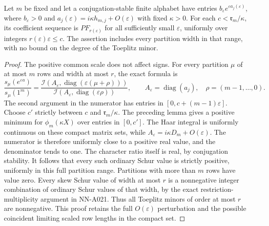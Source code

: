 \begin{lemma}
\label{lem:analytic-uniform-cluster-PF}
Let $m$ be fixed and let a conjugation-stable finite alphabet have
entries $b_\varepsilon e^{\varepsilon a_j(\varepsilon)}$, where
$b_\varepsilon>0$ and
$a_j(\varepsilon)=i\kappa h_{m,j}+O(\varepsilon)$ with fixed
$\kappa>0$. For each $c<\mathfrak r_m/\kappa$, its coefficient
sequence is $PF_{r(\varepsilon)}$ for all sufficiently small
$\varepsilon$, uniformly over integers $r(\varepsilon)\varepsilon\le c$.
The assertion includes every partition width in that range, with no
bound on the degree of the Toeplitz minor.
\end{lemma}

\begin{proof}
The positive common scale does not affect signs. For every partition
$\mu$ of at most $m$ rows and width at most $r$, the exact formula is
\[
 \frac{s_\mu(e^{\varepsilon a})}{s_\mu(1^m)}
       =\frac{\mathcal I(A_\varepsilon,
                       \operatorname{diag}(\varepsilon(\mu+\rho)))}
              {\mathcal I(A_\varepsilon,
                       \operatorname{diag}(\varepsilon\rho))},
            \qquad A_\varepsilon=\operatorname{diag}(a_j),
            \quad \rho=(m-1,\ldots,0).
\]
The second argument in the numerator has entries in
$[0,c+(m-1)\varepsilon]$. Choose $c'$ strictly between $c$ and
$\mathfrak r_m/\kappa$. The preceding lemma gives a positive
minimum for $\phi_m(\kappa X)$ over entries in $[0,c']$.
The Haar integral is uniformly continuous on these compact matrix
sets, while $A_\varepsilon=i\kappa D_m+O(\varepsilon)$.
The numerator is therefore uniformly close to a positive real value,
and the denominator tends to one. The character ratio itself is real,
by conjugation stability. It follows that every such ordinary Schur
value is strictly positive, uniformly in this full partition range.
Partitions with more than $m$ rows have value zero.
Every skew Schur value of width at most $r$ is a nonnegative integer
combination of ordinary Schur values of that width, by the exact
restriction-multiplicity argument in NN-A021. Thus all Toeplitz minors
of order at most $r$ are nonnegative. This proof retains the full
$O(\varepsilon)$ perturbation and the possible coincident limiting
scaled row lengths in the compact set.
\end{proof}

